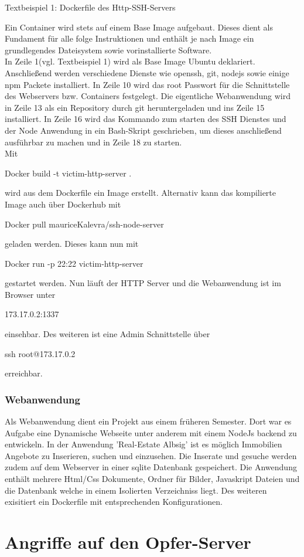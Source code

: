 \documentclass[12pt]{article}
\begin{document}
\begin{center}
 Textbeispiel 1: Dockerfile des Http-SSH-Servers
\end{center}
Ein Container wird stets auf einem Base Image aufgebaut. Dieses dient als Fundament für alle folge Instruktionen und enthält je nach Image ein grundlegendes Dateisystem sowie vorinstallierte Software.\\
In Zeile 1(vgl. Textbeispiel 1) wird als Base Image Ubuntu deklariert. 
Anschließend werden verschiedene Dienste wie openssh, git, nodejs sowie einige npm Packete installiert.
In Zeile 10 wird das root Passwort für die Schnittstelle des Webservers bzw. Containers festgelegt. Die eigentliche Webanwendung wird in Zeile 13 als ein Repository durch git heruntergeladen und ins Zeile 15 installiert. In Zeile 16 wird das Kommando zum starten des SSH Dienstes und der Node Anwendung in ein Bash-Skript geschrieben, um dieses anschließend ausführbar zu machen und in Zeile 18 zu starten.\\
Mit \colorbox{mshadecolor}{\parbox{0.46\textwidth}{Docker build -t victim-http-server .}} wird aus dem Dockerfile ein Image erstellt. Alternativ kann das kompilierte Image auch über Dockerhub mit \colorbox{mshadecolor}{\parbox{0.58\textwidth}{Docker pull mauriceKalevra/ssh-node-server}} geladen werden. Dieses kann nun mit \colorbox{mshadecolor}{\parbox{0.51\textwidth}{Docker run -p 22:22 victim-http-server}} gestartet werden. Nun läuft der HTTP Server und die Webanwendung ist im Browser unter
\colorbox{mshadecolor}{\parbox{0.20\textwidth}{173.17.0.2:1337}} einsehbar. Des weiteren ist eine Admin Schnittstelle über \colorbox{mshadecolor}{\parbox{0.26\textwidth}{ssh root@173.17.0.2}} erreichbar.
\subsubsection{Webanwendung}
Als Webanwendung dient ein Projekt aus einem früheren Semester. Dort war es Aufgabe eine Dynamische Webseite unter anderem mit einem NodeJs backend zu entwickeln. In der Anwendung 'Real-Estate Albsig' ist es möglich Immobilien Angebote zu Inserieren, suchen und einzusehen. Die Inserate und gesuche werden zudem auf dem Webserver in einer sqlite Datenbank gespeichert. Die Anwendung enthält mehrere Html/Css Dokumente, Ordner für Bilder, Javaskript Dateien und die Datenbank welche in einem Isolierten Verzeichniss liegt. Des weiteren exisitiert ein Dockerfile mit entsprechenden Konfigurationen.          
\newpage
\section{Angriffe auf den Opfer-Server}
\end{document}

